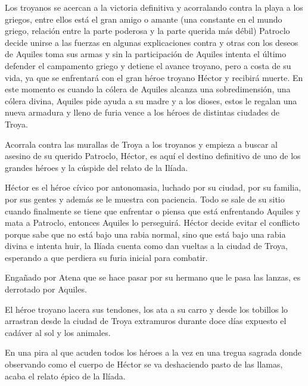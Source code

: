 Los troyanos se acercan a la victoria definitiva y acorralando contra la playa a los griegos, entre ellos está el gran amigo o amante (una constante en el mundo griego, relación entre la parte poderosa y la parte querida más débil) Patroclo decide unirse a las fuerzas en algunas explicaciones contra y otras con los deseos de Aquiles toma sus armas y sin la participación de Aquiles intenta el último defender el campamento griego y detiene el avance troyano, pero a costa de su vida, ya que se enfrentará con el gran héroe troyano Héctor y recibirá muerte. En este momento es cuando la cólera de Aquiles alcanza una sobredimensión, una cólera divina, Aquiles pide ayuda a su madre y a los dioses, estos le regalan una nueva armadura y lleno de furia vence a los héroes de distintas ciudades de Troya.

Acorrala contra las murallas de Troya a los troyanos y empieza a buscar al asesino de su querido Patroclo, Héctor, es aquí el destino definitivo de uno de los grandes héroes y la cúspide del relato de la Ilíada.

Héctor es el héroe cívico por antonomasia, luchado por su ciudad, por su familia, por sus gentes y además se le muestra con paciencia. Todo se sale de su sitio cuando finalmente se tiene que enfrentar o piensa que está enfrentando Aquiles y mata a Patroclo, entonces Aquiles lo perseguirá. Héctor decide evitar el conflicto porque sabe que no está bajo una rabia normal, sino que está bajo una rabia divina e intenta huir, la Ilíada cuenta como dan vueltas a la ciudad de Troya, esperando a que perdiera su furia inicial para combatir.

Engañado por Atena que se hace pasar por su hermano que le pasa las lanzas, es derrotado por Aquiles.

El héroe troyano lacera sus tendones, los ata a su carro y desde los tobillos lo arrastran desde la ciudad de Troya extramuros durante doce días expuesto el cadáver al sol y los animales.

En una pira al que acuden todos los héroes a la vez en una tregua sagrada donde observando como el cuerpo de Héctor se va deshaciendo pasto de las llamas, acaba el relato épico de la Ilíada.